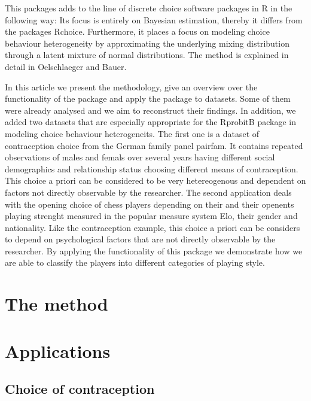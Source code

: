 \documentclass[article]{jss}
\begin{document}
This packages adds to the line of discrete choice software packages in R in the following way: Its focus is entirely on Bayesian estimation, thereby it differs from the packages Rchoice. Furthermore, it places a focus on modeling choice behaviour heterogeneity by approximating the underlying mixing distribution through a latent mixture of normal distributions. The method is explained in detail in Oelschlaeger and Bauer.

In this article we present the methodology, give an overview over the functionality of the package and apply the package to datasets. Some of them were already analysed and we aim to reconstruct their findings. In addition, we added two datasets that are especially appropriate for the RprobitB package in modeling choice behaviour heterogeneits. The first one is a dataset of contraception choice from the German family panel pairfam. It contains repeated observations of males and femals over several years having different social demographics and relationship status choosing different means of contraception. This choice a priori can be considered to be very hetereogenous and dependent on factors not directly observable by the researcher. The second application deals with the opening choice of chess players depending on their and their openents playing strenght measured in the popular measure system Elo, their gender and nationality. Like the contraception example, this choice a priori can be considers to depend on psychological factors that are not directly observable by the researcher. By applying the functionality of this package we demonstrate how we are able to classify the players into different categories of playing style.

\section{The method} \label{sec:method}



\section{Applications} \label{sec:applications}


\subsection{Choice of contraception} \label{subsec:contraception}
\end{document}
